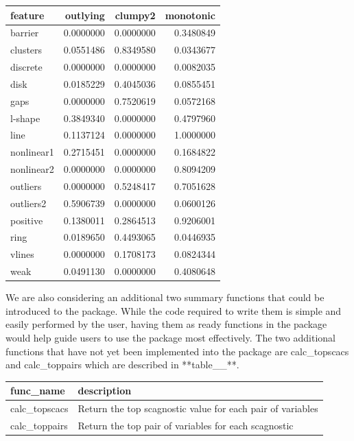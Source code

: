 \begin{Schunk}

\begin{tabular}{l|r|r|r}
\hline
feature & outlying & clumpy2 & monotonic\\
\hline
barrier & 0.0000000 & 0.0000000 & 0.3480849\\
\hline
clusters & 0.0551486 & 0.8349580 & 0.0343677\\
\hline
discrete & 0.0000000 & 0.0000000 & 0.0082035\\
\hline
disk & 0.0185229 & 0.4045036 & 0.0855451\\
\hline
gaps & 0.0000000 & 0.7520619 & 0.0572168\\
\hline
l-shape & 0.3849340 & 0.0000000 & 0.4797960\\
\hline
line & 0.1137124 & 0.0000000 & 1.0000000\\
\hline
nonlinear1 & 0.2715451 & 0.0000000 & 0.1684822\\
\hline
nonlinear2 & 0.0000000 & 0.0000000 & 0.8094209\\
\hline
outliers & 0.0000000 & 0.5248417 & 0.7051628\\
\hline
outliers2 & 0.5906739 & 0.0000000 & 0.0600126\\
\hline
positive & 0.1380011 & 0.2864513 & 0.9206001\\
\hline
ring & 0.0189650 & 0.4493065 & 0.0446935\\
\hline
vlines & 0.0000000 & 0.1708173 & 0.0824344\\
\hline
weak & 0.0491130 & 0.0000000 & 0.4080648\\
\hline
\end{tabular}

\end{Schunk}

We are also considering an additional two summary functions that could
be introduced to the package. While the code required to write them is
simple and easily performed by the user, having them as ready functions
in the package would help guide users to use the package most
effectively. The two additional functions that have not yet been
implemented into the package are calc\_topscacs and calc\_toppairs which
are described in **table\_\_**.

\begin{Schunk}

\begin{tabular}{l|l}
\hline
func\_name & description\\
\hline
calc\_topscacs & Return the top scagnostic value for each pair of variables\\
\hline
calc\_toppairs & Return the top pair of variables for each scagnostic\\
\hline
\end{tabular}

\end{Schunk}

